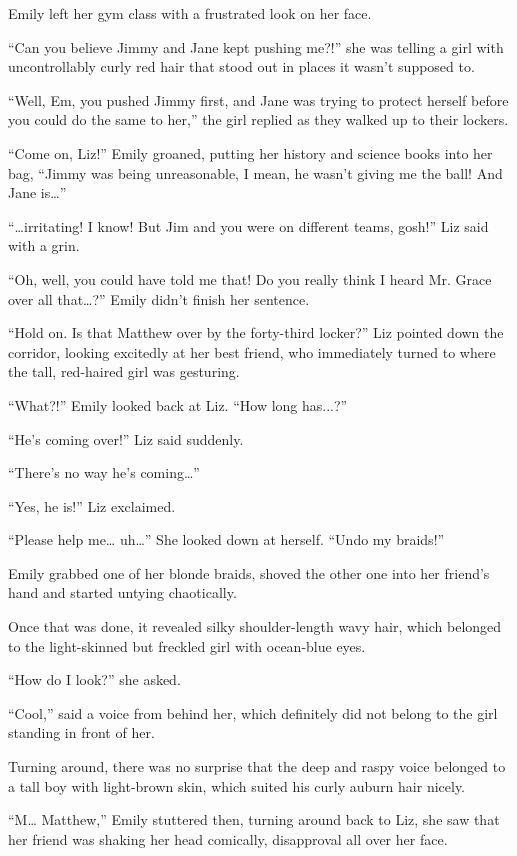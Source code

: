 Emily left her gym class with a frustrated look on her face.

“Can you believe Jimmy and Jane kept pushing me?!” she was telling a girl with uncontrollably curly red hair that stood out in places it wasn't supposed to.

“Well, Em, you pushed Jimmy first, and Jane was trying to protect herself before you could do the same to her,” the girl replied as they walked up to their lockers.

“Come on, Liz!” Emily groaned, putting her history and science books into her bag, “Jimmy was being unreasonable, I mean, he wasn't giving me the ball! And Jane is…”

“…irritating! I know! But Jim and you were on different teams, gosh!” Liz said with a grin.

“Oh, well, you could have told me that! Do you really think I heard Mr. Grace over all that…?” Emily didn't finish her sentence.

“Hold on. Is that Matthew over by the forty-third locker?” Liz pointed down the corridor, looking excitedly at her best friend, who immediately turned to where the tall, red-haired girl was gesturing.

“What?!” Emily looked back at Liz. “How long has...?”

“He's coming over!” Liz said suddenly.

“There's no way he's coming…”

“Yes, he is!” Liz exclaimed.

“Please help me… uh…” She looked down at herself. “Undo my braids!”

Emily grabbed one of her blonde braids, shoved the other one into her friend's hand and started untying chaotically.

Once that was done, it revealed silky shoulder-length wavy hair, which belonged to the light-skinned but freckled girl with ocean-blue eyes.

“How do I look?” she asked.

“Cool,” said a voice from behind her, which definitely did not belong to the girl standing in front of her.

Turning around, there was no surprise that the deep and raspy voice belonged to a tall boy with light-brown skin, which suited his curly auburn hair nicely.

“M… Matthew,” Emily stuttered then, turning around back to Liz, she saw that her friend was shaking her head comically, disapproval all over her face.

